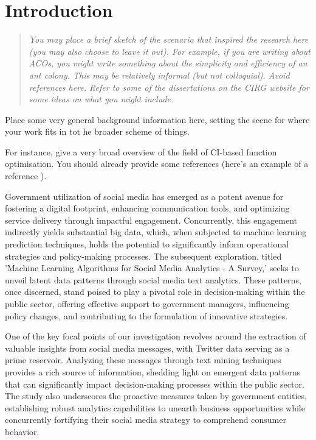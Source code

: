 
\chapter{Introduction}
\label{chap:introduction}
\pagestyle{headings}
\setcounter{page}{1}

\begin{quote}
	{\it You may place a brief sketch of the scenario that inspired the research here (you may also choose to leave it out). For example, if you are writing about ACOs, you might write something about the simplicity and efficiency of an ant colony. This may be relatively informal (but not colloquial). Avoid references here. Refer to some of the dissertations on the CIRG website for some ideas on what you might include.}
\end{quote}
Place some very general background information here, setting the scene for where your work fits in tot he broader scheme of things.

For instance, give a very broad overview of the field of CI-based function optimisation. You should already provide some references (here's an example of a reference \cite{ref:Engelbrecht:2002}).

Government utilization of social media has emerged as a potent avenue for fostering a digital footprint, enhancing communication tools, and optimizing service delivery through impactful engagement. Concurrently, this engagement indirectly yields substantial big data, which, when subjected to machine learning prediction techniques, holds the potential to significantly inform operational strategies and policy-making processes. The subsequent exploration, titled 'Machine Learning Algorithms for Social Media Analytics - A Survey,' seeks to unveil latent data patterns through social media text analytics. These patterns, once discerned, stand poised to play a pivotal role in decision-making within the public sector, offering effective support to government managers, influencing policy changes, and contributing to the formulation of innovative strategies.

One of the key focal points of our investigation revolves around the extraction of valuable insights from social media messages, with Twitter data serving as a prime reservoir. Analyzing these messages through text mining techniques provides a rich source of information, shedding light on emergent data patterns that can significantly impact decision-making processes within the public sector. The study also underscores the proactive measures taken by government entities, establishing robust analytics capabilities to unearth business opportunities while concurrently fortifying their social media strategy to comprehend consumer behavior.

